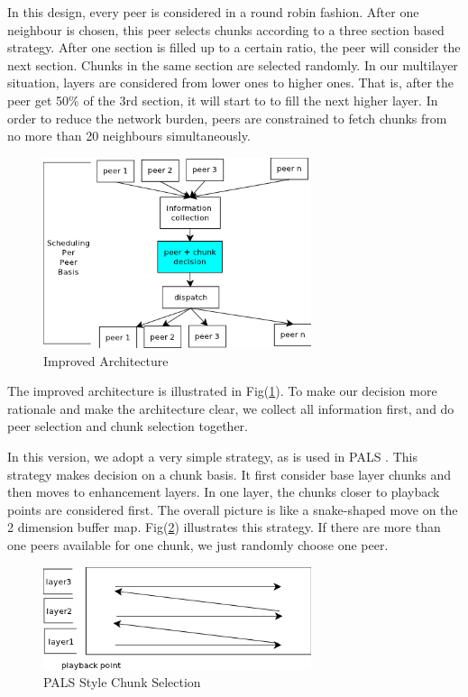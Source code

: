 \documentclass[11pt,a4paper]{article}
\begin{document}
In this design, every peer is considered in a round robin fashion. 
After one neighbour is chosen, this peer selects chunks according to 
a three section based strategy. After one section is filled up to a 
certain ratio, the peer
will consider the next section. Chunks in the same section are selected 
randomly. In our multilayer situation, layers are considered from lower ones
to higher ones. That is, after the peer get 50\% of the 3rd section, 
it will start to to fill the next higher layer. 
In order to reduce the network burden, peers are constrained to fetch chunks
from no more than 20 neighbours simultaneously. 

\begin{figure}[htb]
\centering
	\includegraphics[width=0.7\textwidth]{../fig/arch_improved.png}
	\caption{Improved Architecture}
	\label{fig:simu_arch_improv}
\end{figure}

The improved architecture is illustrated in Fig(\ref{fig:simu_arch_improv}). 
To make our decision more rationale and make the architecture clear,
we collect all information first, and do peer selection and chunk selection 
together. 

In this version, we adopt a very simple strategy, as is used in PALS
\cite{rejaie2003pals}. This strategy makes decision on a chunk basis. 
It first consider base layer chunks and then moves to enhancement layers. 
In one layer, the chunks closer to playback points are considered first. 
The overall picture is like a snake-shaped move on the 2 dimension buffer
map. Fig(\ref{fig:simu_stg_pals}) illustrates this strategy. 
If there are more than one peers available for one chunk, we just randomly 
choose one peer. 

\begin{figure}[htb]
\centering
	\includegraphics[width=0.7\textwidth]{../fig/pals_like.png}
	\caption{PALS Style Chunk Selection}
	\label{fig:simu_stg_pals}
\end{figure}
\end{document}

